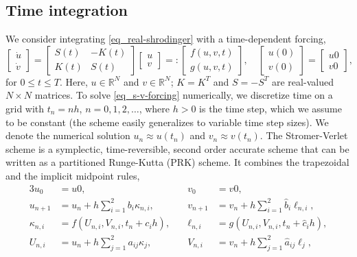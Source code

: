 \documentclass[11pt]{article}
\begin{document}
\subsection{Time integration}
We consider integrating \eqref{eq_real-shrodinger} with a time-dependent forcing,
\begin{equation}\label{eq_s-v-forcing}
  \begin{bmatrix} \dot{u}\\ \dot{v} \end{bmatrix} =
%
  \begin{bmatrix}
    S(t) & -K(t) \\ K(t) & S(t)
  \end{bmatrix}     
  \begin{bmatrix} u\\ v \end{bmatrix}
  =:
%
  \begin{bmatrix}
    f(u,v,t)\\
    g(u,v,t)
  \end{bmatrix},\quad
  \begin{bmatrix}
    u(0)\\
    v(0)
  \end{bmatrix}
  =
    \begin{bmatrix}
    u0\\
    v0
  \end{bmatrix},
%
\end{equation}
for $0 \leq t \leq T$. Here, $u\in \mathbb{R}^N$ and $v\in \mathbb{R}^N$; $K=K^T$ and $S=-S^T$ are
real-valued $N\times N$ matrices.  To solve \eqref{eq_s-v-forcing} numerically, we discretize time
on a grid with $t_n = nh$, $n=0,1,2,\ldots$, where $h>0$ is the time step, which we assume to be
constant (the scheme easily generalizes to variable time step sizes). We denote the numerical solution
$u_n\approx u(t_n)$ and $v_n\approx v(t_n)$.  The Stromer-Verlet scheme is a symplectic,
time-reversible, second order accurate scheme that can be written as a partitioned Runge-Kutta (PRK)
scheme. It combines the trapezoidal and the implicit midpoint rules,
\begin{alignat}{3}
  u_0 &= u0,\quad &
  v_0 &= v0,\\
  u_{n+1} &= u_n + h \sum_{i=1}^2 b_i \kappa_{n,i},\quad &
  v_{n+1} &= v_n + h \sum_{i=1}^2 \hat{b}_i \ell_{n,i},\label{eq_uv-update}\\
  \kappa_{n,i} &= f(U_{n,i}, V_{n,i}, t_n + c_i h),\quad &
  \ell_{n,i} &= g(U_{n,i}, V_{n,i}, t_n + \hat{c}_i h),\\
  U_{n,i} &= u_n + h \sum_{j=1}^2 a_{ij} \kappa_j,\quad &
  V_{n,i} &= v_n + h \sum_{j=1}^2 \hat{a}_{ij} \ell_j,\label{eq_stage-values}
\end{alignat}
\end{document}
